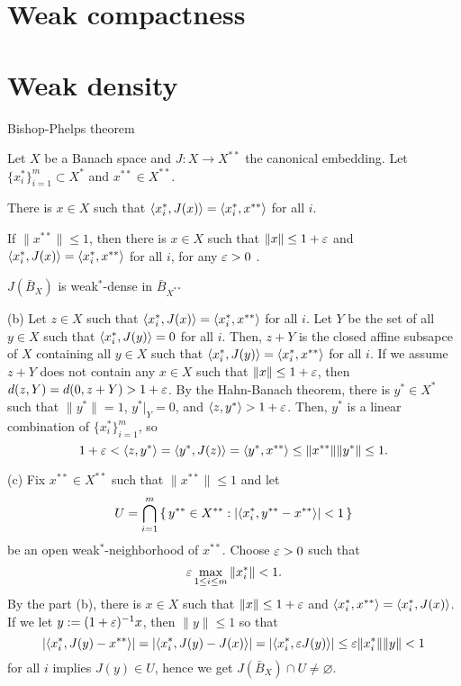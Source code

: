\documentclass{../note}
\begin{document}
\section{Weak compactness}
\begin{prb}
\end{prb}
\begin{prb}
\end{prb}
\begin{prb}
\end{prb}

\section{Weak density}
Bishop-Phelps theorem
\begin{prb}
Let $X$ be a Banach space and $J:X\to X^{**}$ the canonical embedding.
Let $\{x_i^*\}_{i=1}^m\subset X^*$ and $x^{**}\in X^{**}$.
\begin{parts}
\item There is $x\in X$ such that $\langle x_i^*,J(x)\rangle=\langle x_i^*,x^{**}\rangle$ for all $i$.
\item If $\|x^{**}\|\le1$, then there is $x\in X$ such that $\|x\|\le1+\varepsilon$ and $\langle x_i^*,J(x)\rangle=\langle x_i^*,x^{**}\rangle$ for all $i$, for any $\varepsilon>0$ .
\item $J(\bar B_X)$ is weak$^*$-dense in $\bar B_{X^{**}}$
\end{parts}
\end{prb}
\begin{pf}
(b)
Let $z\in X$ such that $\langle x_i^*,J(x)\rangle=\langle x_i^*,x^{**}\rangle$ for all $i$.
Let $Y$ be the set of all $y\in X$ such that $\langle x_i^*,J(y)\rangle=0$ for all $i$.
Then, $z+Y$ is the closed affine subsapce of $X$ containing all $y\in X$ such that $\langle x_i^*,J(y)\rangle=\langle x_i^*,x^{**}\rangle$ for all $i$.
If we assume $z+Y$ does not contain any $x\in X$ such that $\|x\|\le1+\varepsilon$, then $d(z,Y)=d(0,z+Y)>1+\varepsilon$.
By the Hahn-Banach theorem, there is $y^*\in X^*$ such that $\|y^*\|=1$, $y^*|_Y=0$, and $\langle z,y^*\rangle>1+\varepsilon$.
Then, $y^*$ is a linear combination of $\{x_i^*\}_{i=1}^m$, so
\[1+\varepsilon<\langle z,y^*\rangle=\langle y^*,J(z)\rangle=\langle y^*,x^{**}\rangle\le\|x^{**}\|\|y^*\|\le1.\]

(c)
Fix $x^{**}\in X^{**}$ such that $\|x^{**}\|\le1$ and let
\[U=\bigcap_{i=1}^m\,\{\,y^{**}\in X^{**}:|\langle x_i^*,y^{**}-x^{**}\rangle|<1\,\}\]
be an open weak$^*$-neighborhood of $x^{**}$.
Choose $\varepsilon>0$ such that
\[\varepsilon\max_{1\le i\le m}\|x_i^*\|<1.\]
By the part (b), there is $x\in X$ such that $\|x\|\le1+\varepsilon$ and $\langle x_i^*,x^{**}\rangle=\langle x_i^*,J(x)\rangle$.
If we let $y:=(1+\varepsilon)^{-1}x$, then $\|y\|\le 1$ so that
\[|\langle x_i^*,J(y)-x^{**}\rangle|=|\langle x_i^*,J(y)-J(x)\rangle|=|\langle x_i^*,\varepsilon J(y)\rangle|\le\varepsilon\|x_i^*\|\|y\|<1\]
for all $i$ implies $J(y)\in U$, hence we get $J(\bar B_X)\cap U\ne\varnothing$.
\end{pf}
\end{document}
